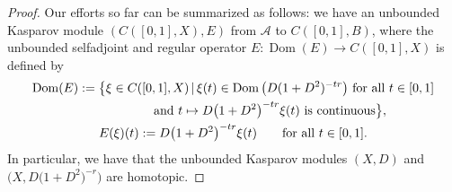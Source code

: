 \documentclass[pdftex]{sigma}
\numberwithin{equation}{section}
\newcommand{\s}[1]{\mathscr{#1}}
\newcommand{\q}{\qquad}
\begin{document}
\begin{proof}
Our efforts so far can be summarized as follows: we have an unbounded Kasparov module $( C([0,1],X), E)$ from $\s A$ to $C([0,1],B)$, where the unbounded selfadjoint and regular operator $E\colon \operatorname{Dom}(E) \to C( [0,1],X)$ is defined by
\begin{gather*}
\operatorname{Dom}(E) := \big\{ \xi \in C( [0,1],X) \,|\, \xi(t) \in \operatorname{Dom}\big( D(1 + D^2)^{-tr}\big) \ \text{for all} \ t \in [0,1] \\
\hphantom{\operatorname{Dom}(E) :=\big\{}{} \text{and} \ t \mapsto D\big(1 + D^2\big)^{-tr} \xi(t) \ \text{is continuous} \big\}, \\
E(\xi)(t) := D\big(1 + D^2\big)^{-tr} \xi(t) \q \text{for all } t \in [0,1] .
\end{gather*}
In particular, we have that the unbounded Kasparov modules $(X,D)$ and $\big(X, D\big(1 + D^2\big)^{-r}\big)$ are homotopic.


\end{proof}
\end{document}
